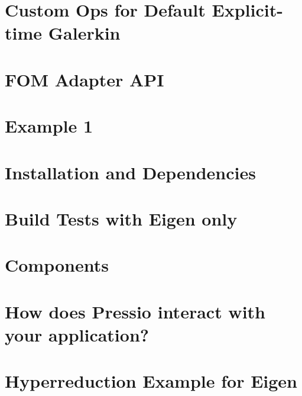 \let\mypdfximage\pdfximage\def\pdfximage{\immediate\mypdfximage}\documentclass[twoside]{book}
\newcommand{\+}{\discretionary{\mbox{\scriptsize$\hookleftarrow$}}{}{}}
\begin{document}
\chapter{Custom Ops for Default Explicit-\/time Galerkin}
\label{md_pages_custom_ops_default_gal_exp}

\chapter{FOM Adapter API}
\label{md_pages_custom_ops}

\chapter{Example 1}
\label{md_pages_examples_example1}

\chapter{Installation and Dependencies}
\label{md_pages_getstarted_build_and_install}

\chapter{Build Tests with Eigen only}
\label{md_pages_getstarted_build_tests_eigen}

\chapter{Components}
\label{md_pages_getstarted_packages}

\chapter{How does Pressio interact with your application?}
\label{md_pages_getstarted_pressio_app}

\chapter{Hyperreduction Example for Eigen}
\label{md_pages_hyperreduction_hyperred_eigen_example}

\end{document}
